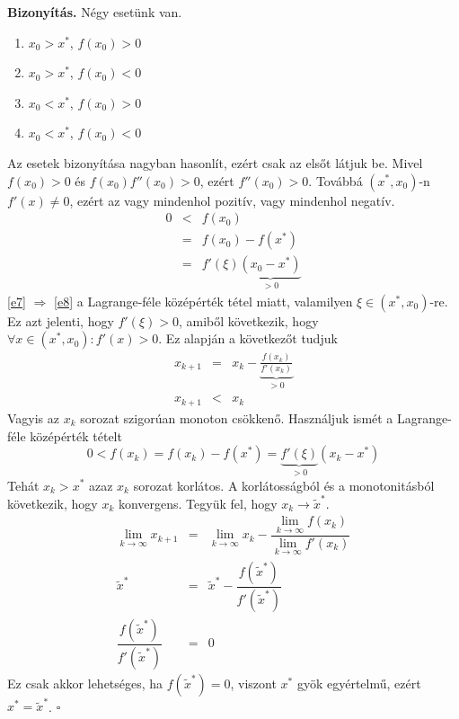 \documentclass[a4paper,12pt]{report}
\newenvironment{Biz}{\noindent \textbf{Bizonyítás. }}{ $\square$}
\begin{document}
			\begin{Biz}
				Négy esetünk van.
				\begin{enumerate}
					\item $x_0>x^*$, $f(x_0)>0$
					\item $x_0>x^*$, $f(x_0)<0$
					\item $x_0<x^*$, $f(x_0)>0$
					\item $x_0<x^*$, $f(x_0)<0$
				\end{enumerate}
				Az esetek bizonyítása nagyban hasonlít, ezért csak az elsőt látjuk be. Mivel $f(x_0)>0$ és $f(x_0)f''(x_0)>0$, ezért $f''(x_0)>0$. Továbbá $(x^*,x_0)$-n $f'(x)\neq 0$, ezért az vagy mindenhol pozitív, vagy mindenhol negatív. 
				\begin{eqnarray}
					\label{e6}0&<&f(x_0)\\
					\label{e7}&=&f(x_0)-f(x^*)\\
					\label{e8}&=&f'(\xi)\underbrace{(x_0-x^*)}_{>0}
				\end{eqnarray}
				\ref{e7} $\Rightarrow$ \ref{e8} a Lagrange-féle középérték tétel miatt, valamilyen $\xi \in (x^*,x_0)$-re. Ez azt jelenti, hogy $f'(\xi)>0$, amiből következik, hogy $\forall x\in (x^*,x_0): f'(x)>0$. Ez alapján a következőt tudjuk
				\begin{eqnarray*}
					x_{k+1}&=&x_k-\underbrace{\frac{f(x_k)}{f'(x_k)}}_{>0} \\
					x_{k+1}&<&x_k
				\end{eqnarray*}
				Vagyis az $x_k$ sorozat szigorúan monoton csökkenő. Használjuk ismét a Lagrange-féle középérték tételt
				\[0<f(x_k)=f(x_k)-f(x^*)=\underbrace{f'(\xi)}_{>0}(x_k-x^*)\]
				Tehát $x_k>x^*$ azaz $x_k$ sorozat korlátos. A korlátosságból és a monotonitásból következik, hogy $x_k$ konvergens. Tegyük fel, hogy $x_k\to \tilde{x}^*$.
				\begin{eqnarray*}
					\lim_{k \to \infty} x_{k+1} &=& \lim_{k \to \infty} x_k - \dfrac{\lim\limits_{k \to \infty} f(x_k)}{\lim\limits_{k \to \infty} f'(x_k)}\\
					\tilde{x}^*&=&\tilde{x}^*-\dfrac{f(\tilde{x}^*)}{f'(\tilde{x}^*)}\\
					\dfrac{f(\tilde{x}^*)}{f'(\tilde{x}^*)}&=&0
				\end{eqnarray*}
				Ez csak akkor lehetséges, ha $f(\tilde{x}^*)=0$, viszont $x^*$ gyök egyértelmű, ezért $x^*=\tilde{x}^*$.
			\end{Biz}
            
            
            
\end{document}
